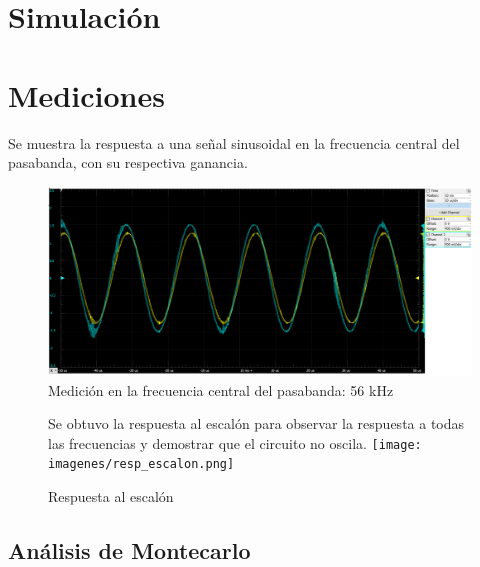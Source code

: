 \documentclass[../../tc_tp5_main.tex]{subfiles}
\begin{document}
 	 \section{Simulación}
		
 	 \section{Mediciones}
 	 
 	 Se muestra la respuesta a una señal sinusoidal en la frecuencia central del pasabanda, con su respectiva ganancia.
 	\begin{figure}[H]	%
	\centering
	\includegraphics[scale=0.5]{imagenes/frec_corte_posta.png}
	\caption{Medición en la frecuencia central del pasabanda: 56 kHz}
	\label{fig:ej2_frec_corte_posta}
	\end{figure}
 	\begin{figure}[H]	%
	\centering
	
	Se obtuvo la respuesta al escalón para observar la respuesta a todas las frecuencias y demostrar que el circuito no oscila.
	\texttt{[image: imagenes/resp\_escalon.png]}
	\caption{Respuesta al escalón}
	\label{fig:ej2_resp_escalon}
	\end{figure}
 	 \subsection{Análisis de Montecarlo}
 	 \subsection{}
\clearpage\newpage
\end{document}
